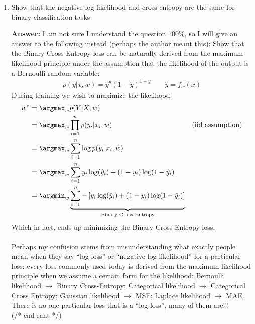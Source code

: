 \documentclass{article}
\newenvironment{QandA}{\begin{enumerate}[label=\arabic*.]}{\end{enumerate}}
\newenvironment{answer}{\par\normalfont \textbf{Answer:}}{}
\newcommand{\g}{\vert}
\begin{document}
\begin{QandA}
    \item Show that the negative log-likelihood and cross-entropy are the same for binary classification tasks.
    \begin{answer}
        I am not sure I understand the question 100\%, so I will give an answer to the following instead (perhaps the author meant this): Show that the Binary Cross Entropy loss can be naturally derived from the maximum likelihood principle under the assumption that the likelihood of the output is a Bernoulli random variable:
        \begin{align*}
            p(y \g x, w) = \hat{y}^y (1-\hat{y})^{1-y} \quad\quad \hat{y} = f_w(x)
        \end{align*}
        During training we wish to maximize the likelihood:
        \begin{align*}
            w^* &= \argmax_{w} p(Y \g X, w) \\
            &= \argmax_{w} \prod_{i=1}^n p(y_i \g x_i, w) &\text{(iid assumption)} \\
            &= \argmax_{w} \sum_{i=1}^n \log p(y_i \g x_i, w) \\
            &= \argmax_{w} \sum_{i=1}^n y_i\log(\hat{y}_i) + (1-y_i)\log(1-\hat{y_i}) \\
            &= \argmin_{w} \underbrace{\sum_{i=1}^n - \left[ y_i\log(\hat{y}_i) + (1-y_i)\log(1-\hat{y}_i)\right]}_{\text{Binary Cross Entropy}}
        \end{align*}
        Which in fact, ends up minimizing the Binary Cross Entropy loss. \\\\
        Perhaps my confusion stems from misunderstanding what exactly people mean when they say ``log-loss'' or ``negative log-likelihood'' for a particular loss: every loss commonly used today is derived from the maximum likelihood principle when we assume a certain form for the likelihood: Bernoulli likelihood $\rightarrow$ Binary Cross-Entropy; Categorical likelihood $\rightarrow$ Categorical Cross Entropy; Gaussian likelihood $\rightarrow$ MSE; Laplace likelihood $\rightarrow$ MAE. There is no one particular loss that is a ``log-loss'', many of them are!!!\\
        (/* end rant */)
    \end{answer}


\end{QandA}
\end{document}

